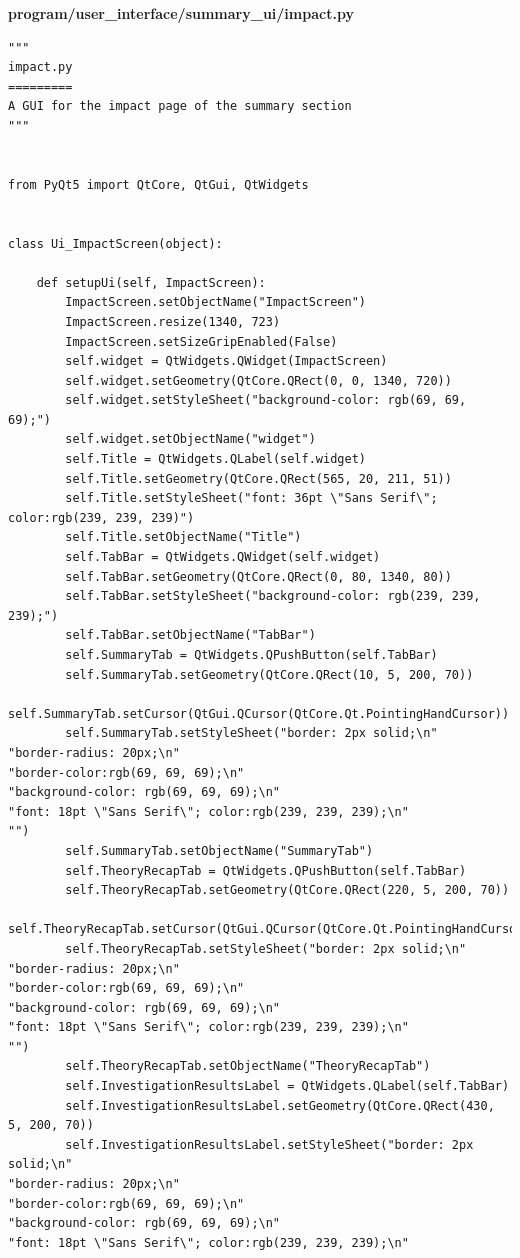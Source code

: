 \documentclass{article}
\begin{document}
\textbf{program/user\_interface/summary\_ui/impact.py}
\begin{lstlisting}
"""
impact.py
=========
A GUI for the impact page of the summary section
"""


from PyQt5 import QtCore, QtGui, QtWidgets


class Ui_ImpactScreen(object):

    def setupUi(self, ImpactScreen):
        ImpactScreen.setObjectName("ImpactScreen")
        ImpactScreen.resize(1340, 723)
        ImpactScreen.setSizeGripEnabled(False)
        self.widget = QtWidgets.QWidget(ImpactScreen)
        self.widget.setGeometry(QtCore.QRect(0, 0, 1340, 720))
        self.widget.setStyleSheet("background-color: rgb(69, 69, 69);")
        self.widget.setObjectName("widget")
        self.Title = QtWidgets.QLabel(self.widget)
        self.Title.setGeometry(QtCore.QRect(565, 20, 211, 51))
        self.Title.setStyleSheet("font: 36pt \"Sans Serif\"; color:rgb(239, 239, 239)")
        self.Title.setObjectName("Title")
        self.TabBar = QtWidgets.QWidget(self.widget)
        self.TabBar.setGeometry(QtCore.QRect(0, 80, 1340, 80))
        self.TabBar.setStyleSheet("background-color: rgb(239, 239, 239);")
        self.TabBar.setObjectName("TabBar")
        self.SummaryTab = QtWidgets.QPushButton(self.TabBar)
        self.SummaryTab.setGeometry(QtCore.QRect(10, 5, 200, 70))
        self.SummaryTab.setCursor(QtGui.QCursor(QtCore.Qt.PointingHandCursor))
        self.SummaryTab.setStyleSheet("border: 2px solid;\n"
"border-radius: 20px;\n"
"border-color:rgb(69, 69, 69);\n"
"background-color: rgb(69, 69, 69);\n"
"font: 18pt \"Sans Serif\"; color:rgb(239, 239, 239);\n"
"")
        self.SummaryTab.setObjectName("SummaryTab")
        self.TheoryRecapTab = QtWidgets.QPushButton(self.TabBar)
        self.TheoryRecapTab.setGeometry(QtCore.QRect(220, 5, 200, 70))
        self.TheoryRecapTab.setCursor(QtGui.QCursor(QtCore.Qt.PointingHandCursor))
        self.TheoryRecapTab.setStyleSheet("border: 2px solid;\n"
"border-radius: 20px;\n"
"border-color:rgb(69, 69, 69);\n"
"background-color: rgb(69, 69, 69);\n"
"font: 18pt \"Sans Serif\"; color:rgb(239, 239, 239);\n"
"")
        self.TheoryRecapTab.setObjectName("TheoryRecapTab")
        self.InvestigationResultsLabel = QtWidgets.QLabel(self.TabBar)
        self.InvestigationResultsLabel.setGeometry(QtCore.QRect(430, 5, 200, 70))
        self.InvestigationResultsLabel.setStyleSheet("border: 2px solid;\n"
"border-radius: 20px;\n"
"border-color:rgb(69, 69, 69);\n"
"background-color: rgb(69, 69, 69);\n"
"font: 18pt \"Sans Serif\"; color:rgb(239, 239, 239);\n"

\end{lstlisting}
\end{document}
